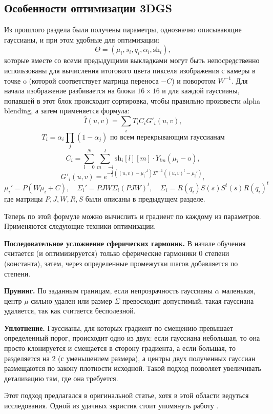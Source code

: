 \subsection{Особенности оптимизации 3DGS}

Из прошлого раздела были получены параметры, однозначно описывающие гауссианы, и при этом удобные для оптимизации:
%
\[
	\Theta = (\mu_i, s_i, q_i, \alpha_i, \mathrm{sh}_i),
\]
%
которые вместе со всеми предыдущими выкладками могут быть непосредственно использованы для вычисления итогового цвета пикселя изображения с камеры в точке $\mathrm o$ (которой соответствует матрица переноса $-C$) и поворотом $W^{-1}$. Для начала изображение разбивается на блоки $16\times16$ и для каждой гауссианы, попавшей в этот блок происходит сортировка, чтобы правильно произвести alpha blending, а затем применяется формула:
%
\[
	\hat I(u, v) = \sum_i T_i C_i G'_i(u, v),
\]
\[
	T_i = \alpha_i \prod_j (1 - \alpha_j) \text{ по всем перекрывающим гауссианам}
\]
\[
	C_i = \sum_{l=0}^N \sum_{m=-l}^l \mathrm{sh}_i[l][m] \cdot Y_{lm}(\mu_i - \mathrm o),
\]
\[
	G'_i(u, v) = e^{-\frac12 ( (u, v) - \mu_i'^t ) \Sigma'^{-1} ( (u, v)^t - \mu_i' )},
\]
\[
	\mu_i' = P( W\mu_i + C ), \quad
	\Sigma_i' = PJW \Sigma_i (PJW)^t, \quad
	\Sigma_i = R(q_i)S(s) S^t(s)R(q_i)^t
\]
%
где матрицы $P, J, W, R, S$ были описаны в предыдущем разделе.

Теперь по этой формуле можно вычислить и градиент по каждому из параметров. Применяются следующие техники оптимизации.

\textbf{Последовательное усложнение сферических гармоник.} В начале обучения считается (и оптимизируется) только сферические гармоники 0 степени (константа), затем, через определенные промежутки шагов добавляется по степени.

\textbf{Прунинг.} По заданным границам, если непрозрачность гауссианы $\alpha$ маленькая, центр $\mu$ сильно удален или размер $\Sigma$ превосходит допустимый, такая гауссиана удаляется, так как считается бесполезной.

\textbf{Уплотнение.} Гауссианы, для которых градиент по смещению превышает определенный порог, происходит одно из двух: если гауссиана небольшая, то она просто клонируется и смещается в сторону градиента, а если большая, то разделяется на 2 (с уменьшением размера), а центры двух полученных гауссиан размещаются по закону плотности исходной. Такой подход позволяет увеличивать детализацию там, где она требуется.

Этот подход предлагался в оригинальной статье, хотя в этой области ведуться исследования. Одной из удачных эвристик стоит упомянуть работу \cite{kheradmand20253dgaussiansplattingmarkov}.